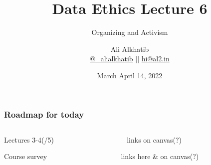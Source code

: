 \documentclass[aspectratio=43,17pt]{beamer} %
\title{Data Ethics Lecture 6}
\subtitle{Organizing and Activism}
\author[Ali Alkhatib]{{Ali Alkhatib}\\
\href{http://twitter.com/_alialkhatib}{@\_alialkhatib} || \href{mailto:hi@al2.in}{hi@al2.in}}
\date{March April 14, 2022}
\newcommand{\onlyinsubfile}[1]{#1}
\newcommand{\notinsubfile}[1]{}
\begin{document}
\renewcommand{\onlyinsubfile}[1]{}
\renewcommand{\notinsubfile}[1]{#1}


\begin{frame}
\titlepage
\end{frame}

\begin{frame}\frametitle{Roadmap for today}
\begin{columns}
\begin{column}{0.5\textwidth}
Lectures 3-4(/5) \hfill \MVRightarrow{}

\vspace{2em}

Course survey \hfill \MVRightarrow{}
\end{column}
\begin{column}{0.4\textwidth}
{\small ~ \vspace{0.5em} links on canvas(?)}

\vspace{2em}

{\small links here \& on canvas(?)}
\end{column}
\end{columns}

\vspace{2em}



\end{frame}
\end{document}
